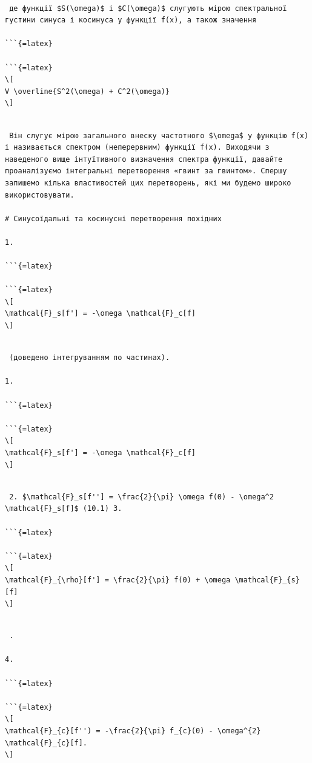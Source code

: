 \documentclass[
  ukrainian,
]{article}
\begin{document}
\begin{verbatim}

 де функції $S(\omega)$ і $C(\omega)$ слугують мірою спектральної густини синуса і косинуса у функції f(x), а також значення

```{=latex}

```{=latex}
\[
V \overline{S^2(\omega) + C^2(\omega)}
\]
\end{verbatim}

\begin{verbatim}

 Він слугує мірою загального внеску частотного $\omega$ у функцію f(x) і називається спектром (неперервним) функції f(x). Виходячи з наведеного вище інтуїтивного визначення спектра функції, давайте проаналізуємо інтегральні перетворення «гвинт за гвинтом». Спершу запишемо кілька властивостей цих перетворень, які ми будемо широко використовувати.

# Синусоїдальні та косинусні перетворення похідних

1.

```{=latex}

```{=latex}
\[
\mathcal{F}_s[f'] = -\omega \mathcal{F}_c[f]
\]
\end{verbatim}

\begin{verbatim}

 (доведено інтегруванням по частинах).

1.

```{=latex}

```{=latex}
\[
\mathcal{F}_s[f'] = -\omega \mathcal{F}_c[f]
\]
\end{verbatim}

\begin{verbatim}

 2. $\mathcal{F}_s[f''] = \frac{2}{\pi} \omega f(0) - \omega^2 \mathcal{F}_s[f]$ (10.1) 3.

```{=latex}

```{=latex}
\[
\mathcal{F}_{\rho}[f'] = \frac{2}{\pi} f(0) + \omega \mathcal{F}_{s}[f]
\]
\end{verbatim}

\begin{verbatim}

 .

4.

```{=latex}

```{=latex}
\[
\mathcal{F}_{c}[f'') = -\frac{2}{\pi} f_{c}(0) - \omega^{2} \mathcal{F}_{c}[f].
\]
\end{verbatim}
\end{document}
